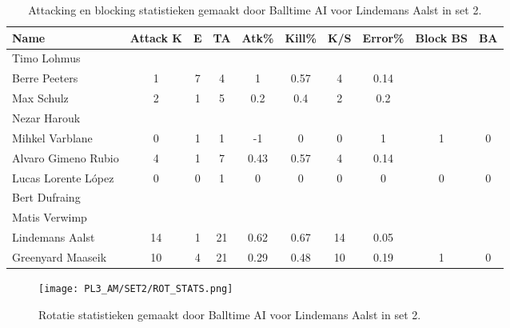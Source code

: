 \begin{table}[ht!]
  \centering
  \scriptsize
  \begin{tabular}{|l|c|c|c|c|c|c|c|c|c|} \hline
    \textbf{Name} & Attack K & E & TA & Atk\% & Kill\% & K/S & Error\% & Block BS & BA \\ \hline
    Timo Lohmus &   &   &   &   &   &   &   &   &   \\
    Berre Peeters & 1 & 7 & 4 & 1 & 0.57 & 4 & 0.14 &   &   \\
    Max Schulz & 2 & 1 & 5 & 0.2 & 0.4 & 2 & 0.2 &   &   \\
    Nezar Harouk &   &   &   &   &   &   &   &   &   \\
    Mihkel Varblane & 0 & 1 & 1 & -1 & 0 & 0 & 1 & 1 & 0 \\
    Alvaro Gimeno Rubio & 4 & 1 & 7 & 0.43 & 0.57 & 4 & 0.14 &   &   \\
    Lucas Lorente López & 0 & 0 & 1 & 0 & 0 & 0 & 0 & 0 & 0 \\
    Bert Dufraing &   &   &   &   &   &   &   &   &   \\
    Matis Verwimp &   &   &   &   &   &   &   &   &   \\
    Lindemans Aalst & 14 & 1 & 21 & 0.62 & 0.67 & 14 & 0.05 &   &   \\
    Greenyard Maaseik & 10 & 4 & 21 & 0.29 & 0.48 & 10 & 0.19 & 1 & 0 \\ \hline
  \end{tabular}
  \caption[Attacking en blocking statistieken gemaakt door Balltime AI voor Lindemans Aalst in set 2]{\label{tab:PL3AttBlockAalst2}Attacking en blocking statistieken gemaakt door Balltime AI voor Lindemans Aalst in set 2.}
\end{table}

\begin{figure}
  \centering
  \texttt{[image: PL3\_AM/SET2/ROT\_STATS.png]}
  \caption{\label{fig:PL3_ROT_STATS_2}Rotatie statistieken gemaakt door Balltime AI voor Lindemans Aalst in set 2.}
\end{figure}